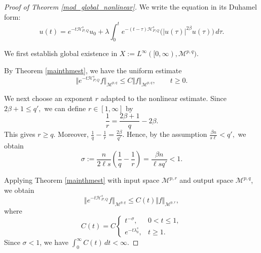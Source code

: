 \documentclass[12pt, reqno]{amsart}
\theoremstyle{definition}
\theoremstyle{remark}
\numberwithin{equation}{section}
\newcommand{\APQ}{\mathcal{H}_{P, Q}}
\begin{document}
\begin{proof}[Proof of Theorem \ref{mod_global_nonlinear}]
We write the equation in its Duhamel form:
\begin{equation}
\label{eq4.5}
    u(t)
    =
    e^{-t\APQ^s}u_0
    +
    \lambda
    \int_0^t
    e^{-(t-\tau)\APQ^s}
    \big(|u(\tau)|^{2\beta}u(\tau)\big)
    \,d\tau .
\end{equation}

We first establish global existence in $X:=L^\infty([0,\infty),\mathcal M^{p,q}).$

By Theorem \ref{mainthmest}, we have the uniform estimate
\begin{equation}
\label{linear_bdd}
    \Vert e^{-t\APQ^s}f\Vert_{\mathcal M^{p,q}}
    \leq
    C\Vert f\Vert_{\mathcal M^{p,q}},
    \qquad t\geq0.
\end{equation}

We next choose an exponent $r$ adapted to the nonlinear estimate. Since $2\beta+1\leq q',$
we can define $r\in[1,\infty]$ by
\begin{equation}
\label{choice_r}
    \frac1r
    =
    \frac{2\beta+1}{q}-2\beta .
\end{equation}
This gives $r\geq q$. Moreover, $\frac1q-\frac1r
    =
    \frac{2\beta}{q'}.$ Hence, by the assumption $\frac{\beta n}{s\ell}<q',$
we obtain
\begin{equation}
\label{sigma_less_one}
    \sigma
    :=
    \frac{n}{2\ell s}
    \left(
    \frac1q-\frac1r
    \right)
    =
    \frac{\beta n}{\ell s q'}
    <1.
\end{equation}

Applying Theorem \ref{mainthmest} with input space $\mathcal M^{p,r}$ and output space $\mathcal M^{p,q}$, we obtain
\begin{equation}
\label{semigroup_kernel_bound}
    \Vert e^{-t\APQ^s}f\Vert_{\mathcal M^{p,q}}
    \leq
    C(t)\Vert f\Vert_{\mathcal M^{p,r}},
\end{equation}
where
\[
    C(t)
    =
    C
    \begin{cases}
        t^{-\sigma}, & 0<t\leq1,\\
        e^{-t\lambda_0^s}, & t\geq1.
    \end{cases}
\]
Since $\sigma<1$, we have $  \int_0^\infty C(t)\,dt<\infty.$


\end{proof}
\end{document}
